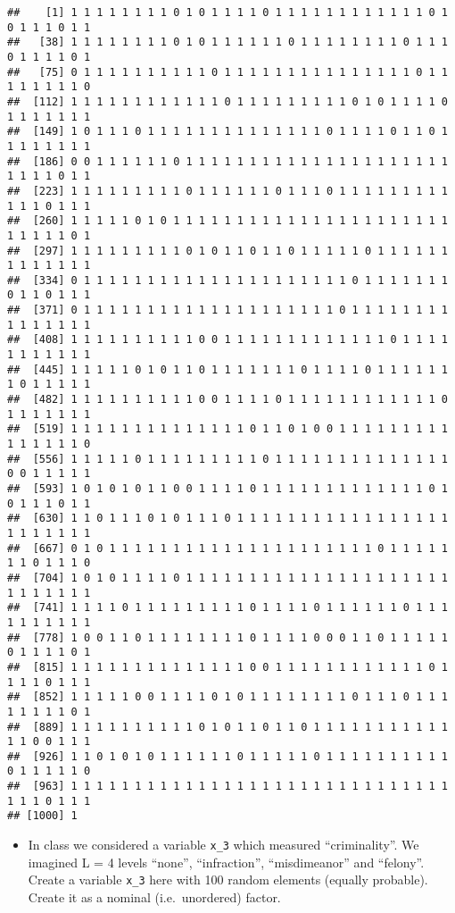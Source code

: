 \documentclass[
]{article}
\providecommand{\tightlist}{%
  \setlength{\itemsep}{0pt}\setlength{\parskip}{0pt}}
\begin{document}
\begin{verbatim}
##    [1] 1 1 1 1 1 1 1 1 0 1 0 1 1 1 1 0 1 1 1 1 1 1 1 1 1 1 1 1 0 1 0 1 1 1 0 1 1
##   [38] 1 1 1 1 1 1 1 1 0 1 0 1 1 1 1 1 1 0 1 1 1 1 1 1 1 1 0 1 1 1 0 1 1 1 1 0 1
##   [75] 0 1 1 1 1 1 1 1 1 1 1 0 1 1 1 1 1 1 1 1 1 1 1 1 1 1 1 0 1 1 1 1 1 1 1 1 0
##  [112] 1 1 1 1 1 1 1 1 1 1 1 1 0 1 1 1 1 1 1 1 1 1 0 1 0 1 1 1 1 0 1 1 1 1 1 1 1
##  [149] 1 0 1 1 1 0 1 1 1 1 1 1 1 1 1 1 1 1 1 1 0 1 1 1 1 0 1 1 0 1 1 1 1 1 1 1 1
##  [186] 0 0 1 1 1 1 1 1 0 1 1 1 1 1 1 1 1 1 1 1 1 1 1 1 1 1 1 1 1 1 1 1 1 1 0 1 1
##  [223] 1 1 1 1 1 1 1 1 1 0 1 1 1 1 1 1 0 1 1 1 0 1 1 1 1 1 1 1 1 1 1 1 1 0 1 1 1
##  [260] 1 1 1 1 1 0 1 0 1 1 1 1 1 1 1 1 1 1 1 1 1 1 1 1 1 1 1 1 1 1 1 1 1 1 1 0 1
##  [297] 1 1 1 1 1 1 1 1 1 0 1 0 1 1 0 1 1 0 1 1 1 1 1 0 1 1 1 1 1 1 1 1 1 1 1 1 1
##  [334] 0 1 1 1 1 1 1 1 1 1 1 1 1 1 1 1 1 1 1 1 1 1 0 1 1 1 1 1 1 1 0 1 1 0 1 1 1
##  [371] 0 1 1 1 1 1 1 1 1 1 1 1 1 1 1 1 1 1 1 1 1 0 1 1 1 1 1 1 1 1 1 1 1 1 1 1 1
##  [408] 1 1 1 1 1 1 1 1 1 1 0 0 1 1 1 1 1 1 1 1 1 1 1 1 1 0 1 1 1 1 1 1 1 1 1 1 1
##  [445] 1 1 1 1 1 0 1 0 1 1 0 1 1 1 1 1 1 1 0 1 1 1 1 0 1 1 1 1 1 1 1 0 1 1 1 1 1
##  [482] 1 1 1 1 1 1 1 1 1 1 0 0 1 1 1 1 0 1 1 1 1 1 1 1 1 1 1 1 1 0 1 1 1 1 1 1 1
##  [519] 1 1 1 1 1 1 1 1 1 1 1 1 1 1 0 1 1 0 1 0 0 1 1 1 1 1 1 1 1 1 1 1 1 1 1 1 0
##  [556] 1 1 1 1 1 0 1 1 1 1 1 1 1 1 1 0 1 1 1 1 1 1 1 1 1 1 1 1 1 1 0 0 1 1 1 1 1
##  [593] 1 0 1 0 1 0 1 1 0 0 1 1 1 1 0 1 1 1 1 1 1 1 1 1 1 1 1 1 0 1 0 1 1 1 0 1 1
##  [630] 1 1 0 1 1 1 0 1 0 1 1 1 0 1 1 1 1 1 1 1 1 1 1 1 1 1 1 1 1 1 1 1 1 1 1 1 1
##  [667] 0 1 0 1 1 1 1 1 1 1 1 1 1 1 1 1 1 1 1 1 1 1 1 1 0 1 1 1 1 1 1 1 0 1 1 1 0
##  [704] 1 0 1 0 1 1 1 1 0 1 1 1 1 1 1 1 1 1 1 1 1 1 1 1 1 1 1 1 1 1 1 1 1 1 1 1 1
##  [741] 1 1 1 1 0 1 1 1 1 1 1 1 1 1 0 1 1 1 1 0 1 1 1 1 1 1 0 1 1 1 1 1 1 1 1 1 1
##  [778] 1 0 0 1 1 0 1 1 1 1 1 1 1 1 0 1 1 1 1 0 0 0 1 1 0 1 1 1 1 1 0 1 1 1 1 0 1
##  [815] 1 1 1 1 1 1 1 1 1 1 1 1 1 1 0 0 1 1 1 1 1 1 1 1 1 1 1 1 0 1 1 1 1 0 1 1 1
##  [852] 1 1 1 1 1 0 0 1 1 1 1 0 1 0 1 1 1 1 1 1 1 1 0 1 1 1 0 1 1 1 1 1 1 1 1 0 1
##  [889] 1 1 1 1 1 1 1 1 1 1 0 1 0 1 1 0 1 1 0 1 1 1 1 1 1 1 1 1 1 1 1 1 0 0 1 1 1
##  [926] 1 1 0 1 0 1 0 1 1 1 1 1 1 0 1 1 1 1 1 0 1 1 1 1 1 1 1 1 1 1 0 1 1 1 1 1 0
##  [963] 1 1 1 1 1 1 1 1 1 1 1 1 1 1 1 1 1 1 1 1 1 1 1 1 1 1 1 1 1 1 1 1 1 0 1 1 1
## [1000] 1
\end{verbatim}

\begin{itemize}
\tightlist
\item
  In class we considered a variable \texttt{x\_3} which measured
  ``criminality''. We imagined L = 4 levels ``none'', ``infraction'',
  ``misdimeanor'' and ``felony''. Create a variable \texttt{x\_3} here
  with 100 random elements (equally probable). Create it as a nominal
  (i.e.~unordered) factor.
\end{itemize}
\end{document}
